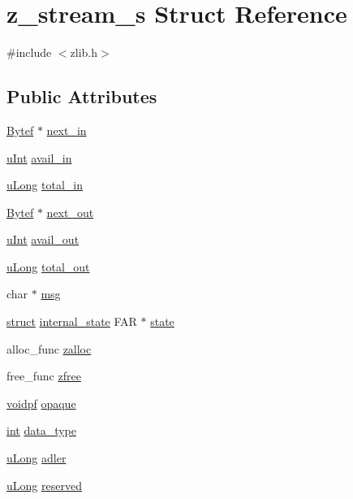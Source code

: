\hypertarget{structz__stream__s}{\section{z\-\_\-stream\-\_\-s Struct Reference}
\label{structz__stream__s}
}


{\ttfamily \#include $<$zlib.\-h$>$}

\subsection*{Public Attributes}
\begin{DoxyCompactItemize}
\item 
\hyperlink{zconf_8h_aeb722a888064be47e12d05f692e0f407}{Bytef} $\ast$ \hyperlink{structz__stream__s_a21d2c026f0f2fcd67f33011231f8ed00}{next\-\_\-in}
\item 
\hyperlink{zconf_8h_a87d141052bcd5ec8a80812a565c70369}{u\-Int} \hyperlink{structz__stream__s_a0cf177f50dbb49692f27480cbcfde794}{avail\-\_\-in}
\item 
\hyperlink{zconf_8h_a154b3b80120c903a368fec5f11f3007a}{u\-Long} \hyperlink{structz__stream__s_aa8f408b9632737dc21519fa1ed34b08d}{total\-\_\-in}
\item 
\hyperlink{zconf_8h_aeb722a888064be47e12d05f692e0f407}{Bytef} $\ast$ \hyperlink{structz__stream__s_aed4a02cfe93e975314fed50b04427bf3}{next\-\_\-out}
\item 
\hyperlink{zconf_8h_a87d141052bcd5ec8a80812a565c70369}{u\-Int} \hyperlink{structz__stream__s_a45ad2364307af9d944fd39d4eca3ca3c}{avail\-\_\-out}
\item 
\hyperlink{zconf_8h_a154b3b80120c903a368fec5f11f3007a}{u\-Long} \hyperlink{structz__stream__s_abae26f1f236cf920250b9d37fdf009c1}{total\-\_\-out}
\item 
char $\ast$ \hyperlink{structz__stream__s_a9b2f745fc780e3b33e2935f8c650a326}{msg}
\item 
\hyperlink{sdlgamepad_8dox_aba655c5729da86df745f0c8e7f9ba8d2}{struct} \hyperlink{structinternal__state}{internal\-\_\-state} F\-A\-R $\ast$ \hyperlink{structz__stream__s_ac4a114217a1868dc6fbe7d1f5bda126b}{state}
\item 
alloc\-\_\-func \hyperlink{structz__stream__s_a23a2299c384f808e76e9908f21216b0f}{zalloc}
\item 
free\-\_\-func \hyperlink{structz__stream__s_a89eb750ade7f4f0b56bfdadf13344982}{zfree}
\item 
\hyperlink{zconf_8h_aa0944432a046192e6602e13ec126acaa}{voidpf} \hyperlink{structz__stream__s_ab72467f908d2ce65d5b42ee6556ef8bb}{opaque}
\item 
\hyperlink{ioapi_8h_a787fa3cf048117ba7123753c1e74fcd6}{int} \hyperlink{structz__stream__s_a9d8f63877d7639a8bca60f9fc3704fc4}{data\-\_\-type}
\item 
\hyperlink{zconf_8h_a154b3b80120c903a368fec5f11f3007a}{u\-Long} \hyperlink{structz__stream__s_ade2217fe31e671be1257731883201223}{adler}
\item 
\hyperlink{zconf_8h_a154b3b80120c903a368fec5f11f3007a}{u\-Long} \hyperlink{structz__stream__s_add73791dd19b49c9c68f3f3d328c37db}{reserved}
\end{DoxyCompactItemize}


